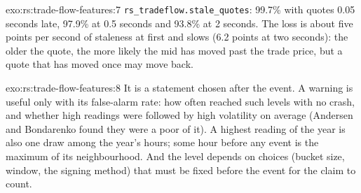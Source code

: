 \begin{solution}{exo:rs:trade-flow-features:7}
\texttt{rs\_tradeflow.stale\_quotes}: 99.7\% with quotes 0.05 seconds late, 97.9\% at 0.5 seconds and 93.8\% at 2 seconds. The loss is about
five points per second of staleness at first and slows (6.2 points at two seconds): the older the quote, the more likely the mid has moved
past the trade price, but a quote that has moved once may move back.
\end{solution}

\begin{solution}{exo:rs:trade-flow-features:8}
It is a statement chosen after the event. A warning is useful only with its false-alarm rate: how often  reached such levels with no crash,
and whether high readings were followed by high volatility on average (Andersen and Bondarenko found they were a poor  of it). A
highest reading of the year is also one draw among the year's hours; some hour before any event is the maximum of its neighbourhood. And the
level depends on choices (bucket size, window, the signing method) that must be fixed before the event for the claim to count.
\end{solution}

